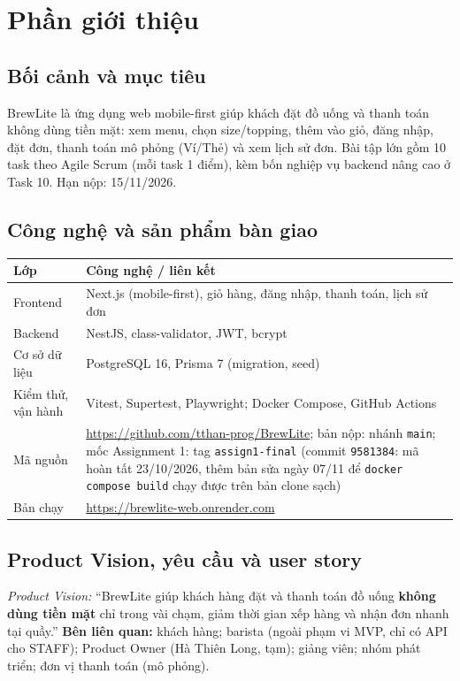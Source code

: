 \documentclass[a4paper]{article}
\begin{document}
\thispagestyle{empty}

\newpage
\tableofcontents
\newpage

\section{Phần giới thiệu}
\subsection{Bối cảnh và mục tiêu}
BrewLite là ứng dụng web mobile-first giúp khách đặt đồ uống và thanh toán không dùng tiền mặt: xem menu, chọn size/topping, thêm vào giỏ, đăng nhập, đặt đơn, thanh toán mô phỏng (Ví/Thẻ) và xem lịch sử đơn. Bài tập lớn gồm 10 task theo Agile Scrum (mỗi task 1 điểm), kèm bốn nghiệp vụ backend nâng cao ở Task 10. Hạn nộp: 15/11/2026.

\subsection{Công nghệ và sản phẩm bàn giao}
\begin{center}
\small\everymath{}
\begin{tabular}{@{}p{2.8cm}p{11.2cm}@{}}
\toprule
\textbf{Lớp} & \textbf{Công nghệ / liên kết} \\ \midrule
Frontend & Next.js (mobile-first), giỏ hàng, đăng nhập, thanh toán, lịch sử đơn \\
Backend & NestJS, class-validator, JWT, bcrypt \\
Cơ sở dữ liệu & PostgreSQL 16, Prisma 7 (migration, seed) \\
Kiểm thử, vận hành & Vitest, Supertest, Playwright; Docker Compose, GitHub Actions \\
Mã nguồn & \url{https://github.com/tthan-prog/BrewLite}; bản nộp: nhánh \texttt{main}; mốc Assignment 1: tag \texttt{assign1-final} (commit \texttt{9581384}: mã hoàn tất 23/10/2026, thêm bản sửa ngày 07/11 để \texttt{docker compose build} chạy được trên bản clone sạch) \\
Bản chạy & \url{https://brewlite-web.onrender.com} \\ \bottomrule
\end{tabular}
\end{center}

\subsection{Product Vision, yêu cầu và user story}
\textit{Product Vision:} ``BrewLite giúp khách hàng đặt và thanh toán đồ uống \textbf{không dùng tiền mặt} chỉ trong vài chạm, giảm thời gian xếp hàng và nhận đơn nhanh tại quầy.'' \textbf{Bên liên quan:} khách hàng; barista (ngoài phạm vi MVP, chỉ có API cho STAFF); Product Owner (Hà Thiên Long, tạm); giảng viên; nhóm phát triển; đơn vị thanh toán (mô phỏng).
\end{document}
